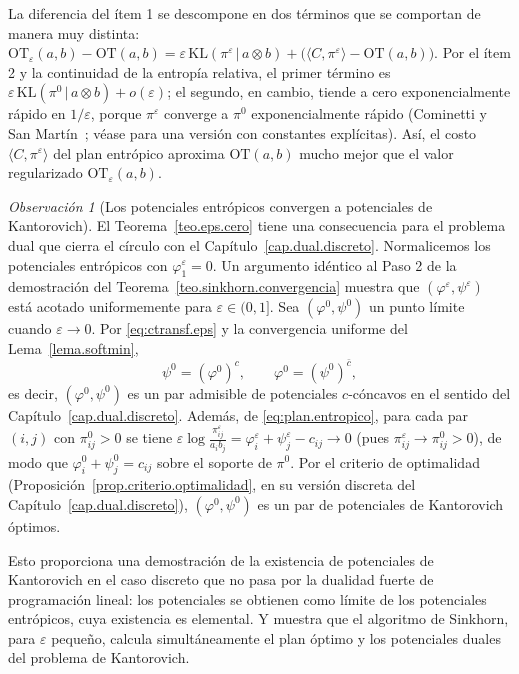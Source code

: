\documentclass[12pt, a4paper]{amsbook}
\theoremstyle{remark}
\newtheorem{obs}[teo]{Observación}
\theoremstyle{definition}
\numberwithin{section}{chapter}
\numberwithin{subsection}{section}
\numberwithin{equation}{section}
\numberwithin{figure}{chapter}
\begin{document}
La diferencia del ítem 1 se descompone en dos términos que se comportan de
manera muy distinta:
$\mathrm{OT}_\varepsilon(a,b)-\mathrm{OT}(a,b)
=\varepsilon\,\mathrm{KL}(\pi^\varepsilon\,|\,a\otimes b)
+\bigl(\langle C,\pi^\varepsilon\rangle-\mathrm{OT}(a,b)\bigr)$. Por el
ítem 2 y la continuidad de la entropía relativa, el primer término es
$\varepsilon\,\mathrm{KL}(\pi^0\,|\,a\otimes b)+o(\varepsilon)$; el segundo,
en cambio, tiende a cero exponencialmente rápido en $1/\varepsilon$, porque
$\pi^\varepsilon$ converge a $\pi^0$ exponencialmente rápido
(Cominetti y San Martín~\cite{Cominetti1994}; véase \cite{Weed2018} para
una versión con constantes explícitas). Así, el costo
$\langle C,\pi^\varepsilon\rangle$ del plan entrópico aproxima
$\mathrm{OT}(a,b)$ mucho mejor que el valor regularizado
$\mathrm{OT}_\varepsilon(a,b)$.

\begin{obs}[Los potenciales entrópicos convergen a potenciales de Kantorovich]\label{obs.potenciales.eps}
El Teorema~\ref{teo.eps.cero} tiene una consecuencia para el problema dual
que cierra el círculo con el Capítulo~\ref{cap.dual.discreto}. Normalicemos
los potenciales entrópicos con $\varphi^\varepsilon_1=0$. Un argumento
idéntico al Paso 2 de la demostración del
Teorema~\ref{teo.sinkhorn.convergencia} muestra que
$(\varphi^\varepsilon,\psi^\varepsilon)$ está acotado uniformemente para
$\varepsilon\in(0,1]$. Sea $(\varphi^0,\psi^0)$ un punto límite cuando
$\varepsilon\to0$. Por \eqref{eq:ctransf.eps} y la convergencia uniforme del
Lema~\ref{lema.softmin},
\[
\psi^0=(\varphi^0)^c,
\qquad
\varphi^0=(\psi^0)^{\bar c},
\]
es decir, $(\varphi^0,\psi^0)$ es un par admisible de potenciales
$c$-cóncavos en el sentido del Capítulo~\ref{cap.dual.discreto}. Además, de
\eqref{eq:plan.entropico}, para cada par $(i,j)$ con $\pi^0_{ij}>0$ se tiene
$\varepsilon\log\frac{\pi^\varepsilon_{ij}}{a_ib_j}=\varphi^\varepsilon_i+\psi^\varepsilon_j-c_{ij}\to0$
(pues $\pi^\varepsilon_{ij}\to\pi^0_{ij}>0$), de modo que
$\varphi^0_i+\psi^0_j=c_{ij}$ sobre el soporte de $\pi^0$. Por el criterio
de optimalidad (Proposición~\ref{prop.criterio.optimalidad}, en su versión
discreta del Capítulo~\ref{cap.dual.discreto}), $(\varphi^0,\psi^0)$ es un par
de potenciales de Kantorovich óptimos.

Esto proporciona una demostración de la existencia de potenciales de
Kantorovich en el caso discreto que no pasa por la dualidad fuerte de
programación lineal: los potenciales se obtienen como límite de los
potenciales entrópicos, cuya existencia es elemental. Y muestra que el
algoritmo de Sinkhorn, para $\varepsilon$ pequeño, calcula simultáneamente el
plan óptimo y los potenciales duales del problema de Kantorovich.
\end{obs}
\end{document}
